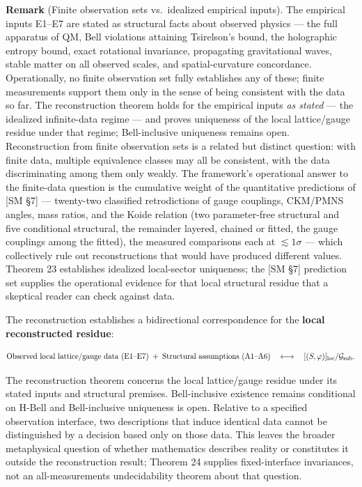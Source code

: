 \documentclass[
]{article}
\begin{document}
\textbf{Remark} (Finite observation sets vs.~idealized empirical
inputs). The empirical inputs E1--E7 are stated as structural facts
about observed physics --- the full apparatus of QM, Bell violations
attaining Tsirelson's bound, the holographic entropy bound, exact
rotational invariance, propagating gravitational waves, stable matter on
all observed scales, and spatial-curvature concordance. Operationally,
no finite observation set fully establishes any of these; finite
measurements support them only in the sense of being consistent with the
data so far. The reconstruction theorem holds for the empirical inputs
\emph{as stated} --- the idealized infinite-data regime --- and proves
uniqueness of the local lattice/gauge residue under that regime;
Bell-inclusive uniqueness remains open. Reconstruction from finite
observation sets is a related but distinct question: with finite data,
multiple equivalence classes may all be consistent, with the data
discriminating among them only weakly. The framework's operational
answer to the finite-data question is the cumulative weight of the
quantitative predictions of {[}SM §7{]} --- twenty-two classified
retrodictions of gauge couplings, CKM/PMNS angles, mass ratios, and the
Koide relation (two parameter-free structural and five conditional
structural, the remainder layered, chained or fitted, the gauge
couplings among the fitted), the measured comparisons each at
\(\lesssim 1\sigma\) --- which collectively rule out reconstructions
that would have produced different values. Theorem 23 establishes
idealized local-sector uniqueness; the {[}SM §7{]} prediction set
supplies the operational evidence for that local structural residue that
a skeptical reader can check against data.

The reconstruction establishes a bidirectional correspondence for the
\textbf{local reconstructed residue}:

\[\text{Observed local lattice/gauge data (E1–E7)} \; + \; \text{Structural assumptions (A1–A6)} \quad \longleftrightarrow \quad [ (S,\varphi) ]_{\rm loc}/\mathcal{G}_{\text{sub}}.\]

The reconstruction theorem concerns the local lattice/gauge residue
under its stated inputs and structural premises. Bell-inclusive
existence remains conditional on H-Bell and Bell-inclusive uniqueness is
open. Relative to a specified observation interface, two descriptions
that induce identical data cannot be distinguished by a decision based
only on those data. This leaves the broader metaphysical question of
whether mathematics describes reality or constitutes it outside the
reconstruction result; Theorem 24 supplies fixed-interface invariances,
not an all-measurements undecidability theorem about that question.
\end{document}
